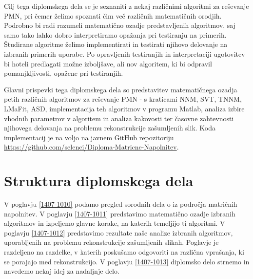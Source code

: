 Cilj tega 
diplomskega dela se je seznaniti z nekaj različnimi algoritmi
za reševanje PMN, pri čemer 
želimo spoznati čim več različnih matematičnih orodjih.
Podrobno bi radi razumeli matematično ozadje predstavljenih algoritmov, saj samo tako lahko dobro interpretiramo opažanja pri testiranju na primerih.
Študirane algoritme želimo implementirati in testirati njihovo delovanje na izbranih primerih uporabe. Po opravljenih testiranjih in interpretaciji ugotovitev bi hoteli predlagati možne izboljšave, ali nov algoritem, ki bi odpravil pomanjkljivosti, opažene pri testiranjih. 

Glavni prispevki tega diplomskega dela so 
predstavitev matematičnega ozadja petih različnih algoritmov za reševanje PMN - s kraticami NNM, SVT, TNNM, LMaFit, ASD,
implementacija teh algoritmov v programu Matlab, analiza izbire vhodnih parametrov v algoritem in analiza kakovosti ter časovne zahtevnosti njihovega delovanja na  problemu rekonstrukcije zašumljenih slik. Koda implementacij je na voljo na javnem GitHub repozitoriju \url{https://github.com/selenci/Diploma-Matricne-Napolnitev}.

\iffalse
Cilj diplomske naloge je predstaviti uporabnost algoritmov, ter razložiti zakaj delujejo. Ideje različnih algoritmov ter njihove pristope do problema poskušamo kar se da jasno predstaviti in interpretirati.
\fi

\iffalse
Glavni prispevki te diplomske naloge so implementacija vseh omenjenih algoritmov, testiranje algoritmov na različnih primerih ter odgovori na vprašanja o uporabnosti metod, ki se nam med implementacijo porodijo. Podamo tudi vizualen prikaz rekonstruiranih slik, kot tudi grafičen prikaz napak in časov do konvergence programov.
\fi

\section{Struktura diplomskega dela}

V poglavju \ref{1407-1010} podamo pregled sorodnih dela o iz področja matričnih napolnitev. V poglavju \ref{1407-1011} predstavimo matematično ozadje izbranih algoritmov in izpeljemo glavne korake, na katerih temeljijo ti algoritmi. V poglavju \ref{1407-1012} predstavimo rezultate naše analize izbranih algoritmov, uporabljenih na problemu rekonstrukcije zašumljenih slikah. Poglavje je razdeljeno na razdelke, v katerih poskušamo odgovoriti na različna vprašanja, ki se porajajo med rekonstrukcijo. V poglavju \ref{1407-1013} diplomsko delo strnemo in navedemo nekaj idej za nadaljnje delo.